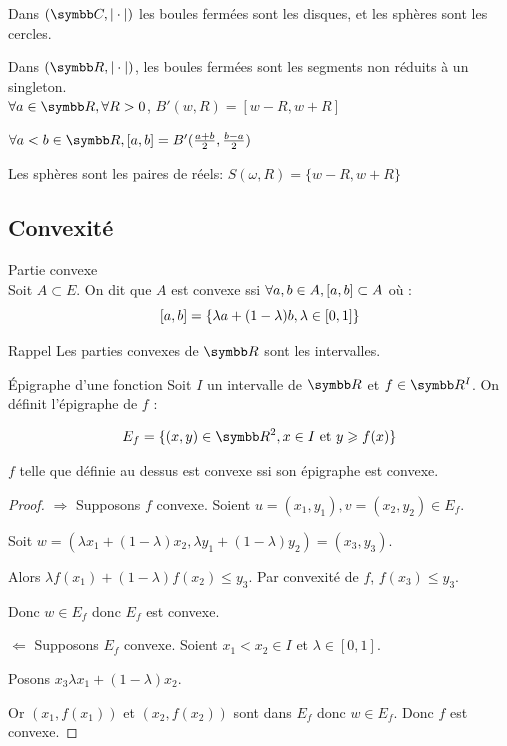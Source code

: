 \begin{exemple}
    Dans $(\C, |\cdot|)$ les boules fermées sont les disques, et les sphères sont les cercles. 

    Dans $(\R, |\cdot|)$, les boules fermées sont les segments non 
    réduits à un singleton. \\
    
    $\forall a \in \R, \forall R > 0$, $B'(w, R) = \left[w - R, w + R\right]$

    $\forall a < b \in \R, \left[a, b \right] = B'(\frac{a + b} 2, \frac{b - a} 2)$

    Les sphères sont les paires de réels: $S(\omega, R) = \{w - R, w + R\}$
\end{exemple}

\subsection{Convexité}

\begin{definition}{Partie convexe}{}
    \\Soit $A \subset E$. 
    On dit que $A$ est convexe ssi $\forall a, b \in A, \left[a, b\right] \subset A$ où :
    \[\left[a, b\right] = \{\lambda a + (1 - \lambda)b, \lambda \in [0, 1]\}\]
\end{definition}

\begin{theoreme}{Rappel}{}
    Les parties convexes de $\R$ sont les intervalles.
\end{theoreme}


\begin{definition}{Épigraphe d'une fonction}{}
    Soit $I$ un intervalle de $\R$ et $f \in \R^{I}$.
    On définit l'épigraphe de $f$ :

    \[ E_f = \{(x,y) \in \R^2, x \in I~\text{et}~y \geqslant f(x)\}\]     
\end{definition}

\begin{proposition}{}{}
    $f$ telle que définie au dessus est convexe ssi son épigraphe est convexe.
\end{proposition}

\begin{proof}
    $\Rightarrow$ Supposons $f$ convexe.
    Soient $u=(x_1,y_1), v=(x_2,y_2) \in E_f$.

    Soit $w = (\lambda x_1 + (1 - \lambda) x_2, \lambda y_1 + (1 - \lambda) y_2) = (x_3, y_3)$.

    Alors $\lambda f(x_1) + (1 - \lambda)f(x_2) \leqslant y_3$.
    Par convexité de $f$, $f(x_3) \leqslant y_3$.

    Donc $w \in E_f$ donc $E_f$ est convexe.

    $\Leftarrow$ Supposons $E_f$ convexe.
    Soient $x_1 < x_2 \in I$ et $\lambda \in [0,1]$.

    Posons $x_3  \lambda x_1 + (1 - \lambda) x_2$.

    Or $(x_1,f(x_1))$ et $(x_2,f(x_2))$ sont dans $E_f$ donc $w \in E_f$. Donc $f$ est convexe.
\end{proof}

